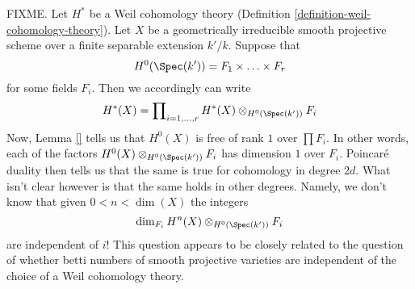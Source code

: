 \begin{remark}
\label{remark-betti-numbers-in-some-sense}
FIXME.
Let $H^*$ be a Weil cohomology theory
(Definition \ref{definition-weil-cohomology-theory}).
Let $X$ be a geometrically irreducible smooth projective scheme
over a finite separable extension $k'/k$. Suppose that
$$
H^0(\Spec(k')) = F_1 \times \ldots \times F_r
$$
for some fields $F_i$. Then we accordingly can write
$$
H^*(X) = \prod\nolimits_{i = 1, \ldots, r}
H^*(X) \otimes_{H^0(\Spec(k'))} F_i
$$
Now, Lemma \ref{} tells us that $H^0(X)$ is free of rank $1$
over $\prod F_i$. In other words, each of the factors
$H^0(X) \otimes_{H^0(\Spec(k'))} F_i$ has dimension $1$ over $F_i$.
Poincar\'e duality then tells us that the same is true for
cohomology in degree $2d$.
What isn't clear however is that the same holds in other degrees.
Namely, we don't know that given $0 < n < \dim(X)$ the integers
$$
\dim_{F_i} H^n(X) \otimes_{H^0(\Spec(k'))} F_i
$$
are independent of $i$! This question appears to be closely related
to the question of whether betti numbers of smooth projective
varieties are independent of the choice of a Weil cohomology theory.
\end{remark}














